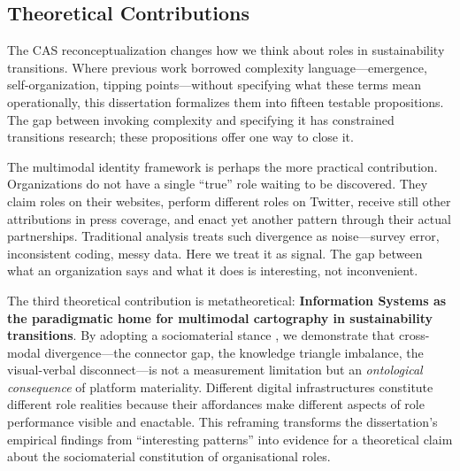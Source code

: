 \documentclass[../main.tex]{subfiles}
\begin{document}
\subsection{Theoretical Contributions}

The CAS reconceptualization changes how we think about roles in sustainability transitions. Where previous work borrowed complexity language---emergence, self-organization, tipping points---without specifying what these terms mean operationally, this dissertation formalizes them into fifteen testable propositions. The gap between invoking complexity and specifying it has constrained transitions research; these propositions offer one way to close it.

The multimodal identity framework is perhaps the more practical contribution. Organizations do not have a single ``true'' role waiting to be discovered. They claim roles on their websites, perform different roles on Twitter, receive still other attributions in press coverage, and enact yet another pattern through their actual partnerships. Traditional analysis treats such divergence as noise---survey error, inconsistent coding, messy data. Here we treat it as signal. The gap between what an organization says and what it does is interesting, not inconvenient.

The third theoretical contribution is metatheoretical: \textbf{Information Systems as the paradigmatic home for multimodal cartography in sustainability transitions}. By adopting a sociomaterial stance \cite{Orlikowski2007,orlikowski2008sociomateriality,leonardi2012materiality}, we demonstrate that cross-modal divergence---the connector gap, the knowledge triangle imbalance, the visual-verbal disconnect---is not a measurement limitation but an \emph{ontological consequence} of platform materiality. Different digital infrastructures constitute different role realities because their affordances make different aspects of role performance visible and enactable. This reframing transforms the dissertation's empirical findings from ``interesting patterns'' into evidence for a theoretical claim about the sociomaterial constitution of organisational roles.
\end{document}
